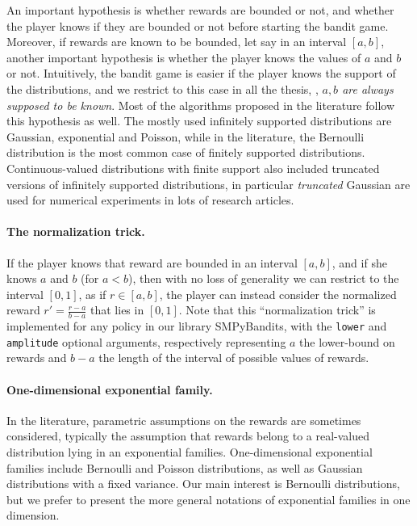An important hypothesis is whether rewards are bounded or not,
and whether the player knows if they are bounded or not before starting the bandit game.
Moreover, if rewards are known to be bounded, let say in an interval $[a,b]$, another important hypothesis is whether the player knows the values of $a$ and $b$ or not.
%
Intuitively, the bandit game is easier if the player knows the support of the distributions, and we restrict to this case in all the thesis, \ie, \emph{$a,b$ are always supposed to be known}.
Most of the algorithms proposed in the literature follow this hypothesis as well.
%
The mostly used
infinitely supported distributions are Gaussian, exponential and Poisson,
while in the literature, the Bernoulli distribution is the most common case of finitely supported distributions.
Continuous-valued distributions with finite support also included truncated versions of infinitely supported distributions, in particular \emph{truncated} Gaussian are used for numerical experiments in lots of research articles.

\paragraph{The normalization trick.}
\label{par:2:normalizationTrick}
%
If the player knows that reward are bounded in an interval $[a,b]$, and if she knows $a$ and $b$ (for $a<b$), then with no loss of generality we can restrict to the interval $[0,1]$, as if $r\in[a,b]$, the player can instead consider the normalized reward $r' = \frac{r-a}{b-a}$ that lies in $[0,1]$.
Note that this ``normalization trick'' is implemented for any policy in our library SMPyBandits, with the \texttt{lower} and \texttt{amplitude} optional arguments, respectively representing $a$ the lower-bound on rewards and $b-a$ the length of the interval of possible values of rewards.


\paragraph{One-dimensional exponential family.}
%

In the literature, parametric assumptions on the rewards are sometimes considered, typically the assumption that rewards belong to a real-valued distribution lying in an exponential families.
One-dimensional exponential families include Bernoulli and Poisson distributions, as well as Gaussian distributions with a fixed variance.
Our main interest is Bernoulli distributions, but we prefer to present the more general notations of exponential families in one dimension.

